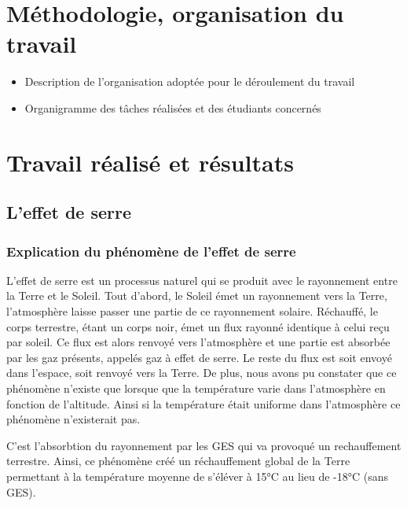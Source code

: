 \documentclass[a4paper, 12pt]{report} %
\begin{document}

\chapter{Méthodologie, organisation du travail}

\begin{itemize}
\item Description de l'organisation adoptée pour le déroulement du travail
\item Organigramme des tâches réalisées et des étudiants concernés
\end{itemize}


\chapter{Travail réalisé et résultats}

\section{L'effet de serre}

\subsection{Explication du phénomène de l'effet de serre}

	L'effet de serre est un processus naturel qui se produit 
avec le rayonnement entre la Terre et le Soleil. Tout d'abord, 
le Soleil émet un rayonnement vers la Terre, l'atmosphère 
laisse passer une partie de ce rayonnement solaire. Réchauffé, 
le corps terrestre, étant un corps noir, émet un flux rayonné 
identique à celui reçu par soleil. Ce flux est alors renvoyé 
vers l'atmosphère et une partie est absorbée par les gaz 
présents, appelés gaz à effet de serre. Le reste du flux 
est soit envoyé dans l'espace, soit renvoyé vers la Terre. 
De plus, nous avons pu constater que ce phénomène n'existe 
que lorsque que la température varie dans l'atmosphère en 
fonction de l'altitude. Ainsi si la température était uniforme 
dans l'atmosphère ce phénomène n'existerait pas. \vspace{\baselineskip}

	C'est l'absorbtion du rayonnement par les GES qui va 
provoqué un rechauffement terrestre. Ainsi, ce phénomène 
créé un réchauffement global de la Terre permettant à la 
température moyenne de s'éléver à 15°C au lieu de -18°C 
(sans GES). 
\end{document}
